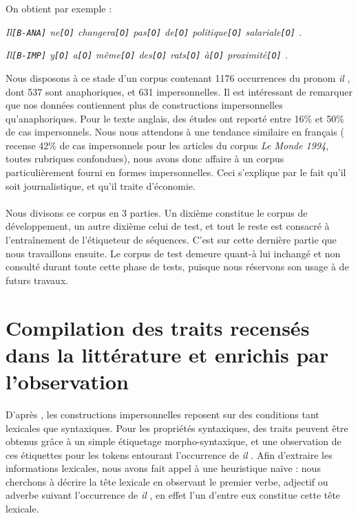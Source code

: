 \documentclass[a4paper,12pt]{article}
\begin{document}
On obtient par exemple :

\textit{Il\verb![B-ANA]! ne\verb![O]! changera\verb![O]! pas\verb![O]! de\verb![O]! politique\verb![O]! salariale\verb![O]! .}

\textit{Il\verb![B-IMP]! y\verb![O]! a\verb![O]! même\verb![O]! des\verb![O]! rats\verb![O]! à\verb![O]! proximité\verb![O]! .}

Nous disposons à ce stade d'un corpus contenant 1176 occurrences du pronom \og \textit{il} \fg{}, dont 537 sont anaphoriques, et 631 impersonnelles. Il est intéressant de remarquer que nos données contiennent plus de constructions impersonnelles qu'anaphoriques. Pour le texte anglais, des études \citep{gundel} ont reporté entre 16\% et 50\% de cas impersonnels. Nous nous attendons à une tendance similaire en français (\citeauthor{danlos-ilimp-taln2005} recense 42\% de cas impersonnels pour les articles du corpus \textit{Le Monde 1994}, toutes rubriques confondues), nous avons donc affaire à un corpus particulièrement fourni en formes impersonnelles. Ceci s'explique par le fait qu'il soit journalistique, et qu'il traite d'économie.

\paragraph{}
Nous divisons ce corpus en 3 parties. Un dixième constitue le corpus de développement, un autre dixième celui de test, et tout le reste est consacré à l'entraînement de l'étiqueteur de séquences.
C'est sur cette dernière partie que nous travaillons ensuite.
Le corpus de test demeure quant-à lui inchangé et non consulté durant toute cette phase de tests, puisque nous réservons son usage à de futurs travaux.

\section{Compilation des traits recensés dans la littérature et enrichis par l'observation}
\label{approche-traits}

D'après \citeauthor{danlos-ilimp-taln2005}, les constructions impersonnelles reposent sur des conditions tant lexicales que syntaxiques. Pour les propriétés syntaxiques, des traits peuvent \^etre obtenus grâce à un simple étiquetage morpho-syntaxique, et une observation de ces étiquettes pour les tokens entourant l'occurrence de \og \textit{il} \fg{}. Afin d'extraire les informations lexicales, nous avons fait appel à une heuristique naïve : nous cherchons à décrire la tête lexicale en observant le premier verbe, adjectif ou adverbe suivant l'occurrence de \og \textit{il} \fg{}, en effet l'un d'entre eux constitue cette tête lexicale.
\end{document}
